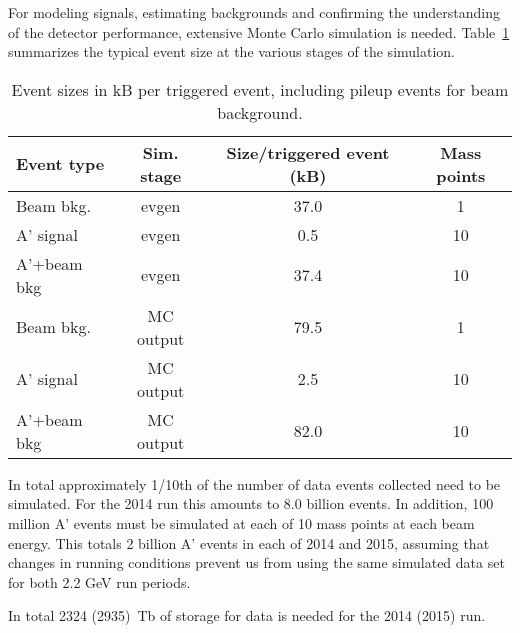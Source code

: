 For modeling signals, estimating backgrounds and confirming the understanding of the detector 
performance, extensive Monte Carlo simulation is needed. Table~\ref{tab:mc_event_size} summarizes 
the typical event size at the various stages of the simulation. 
\begin{table}[]
\centering
\begin{tabular}{|lccc|}
\hline
Event type & Sim. stage & Size/triggered event (kB) & Mass points  \\
\hline
Beam bkg.  & evgen	& 37.0	& 1	\\
A' signal & evgen	& 0.5	& 10	\\
A'+beam bkg & evgen	& 37.4	& 10	\\
\hline
Beam bkg.  & MC output	& 79.5	& 1	\\
A' signal & MC output	& 2.5	& 10	\\
A'+beam bkg & MC output	& 82.0	& 10	\\
\hline
\end{tabular}
\caption{{\small Event sizes in kB per triggered event, including pileup events for beam background. }}
\label{tab:mc_event_size}
\end{table}

In total approximately 1/10th of the number of data events collected need to be simulated. For the 2014 run this amounts to 8.0 billion events.
In addition, 100 million A' events must be simulated at each of 10 mass points at each beam energy. 
This totals 2 billion A' events in each of 2014 and 2015, assuming that changes in running conditions prevent us from using the same simulated data set for both 2.2 GeV run periods.

In total 2324 (2935)~Tb of storage for data is needed for the 2014 (2015) run.

